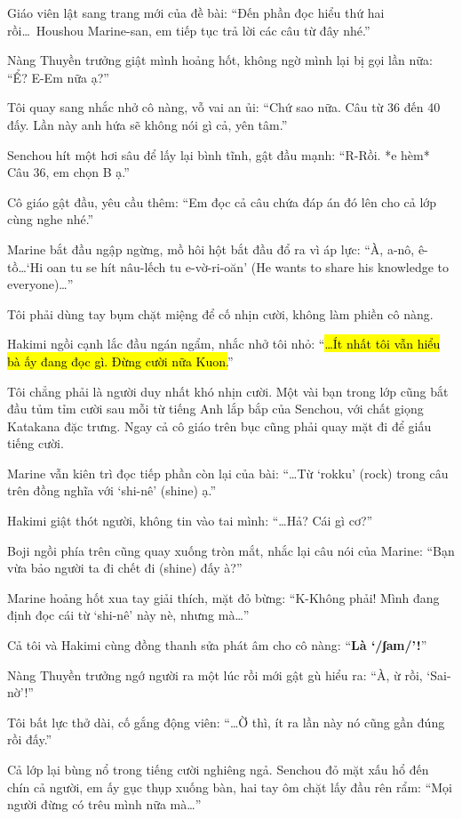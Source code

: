 \documentclass[../main.tex]{subfiles}
\begin{document}
Giáo viên lật sang trang mới của đề bài: ``Đến phần đọc hiểu thứ hai rồi\dots\ Houshou Marine-san, em tiếp tục trả lời các câu từ đây nhé.''

Nàng Thuyền trưởng giật mình hoảng hốt, không ngờ mình lại bị gọi lần nữa: ``Ể? E-Em nữa ạ?''

Tôi quay sang nhắc nhở cô nàng, vỗ vai an ủi: ``Chứ sao nữa. Câu từ 36 đến 40 đấy. Lần này anh hứa sẽ không nói gì cả, yên tâm.''

Senchou hít một hơi sâu để lấy lại bình tĩnh, gật đầu mạnh: ``R-Rồi. *e hèm* Câu 36, em chọn B ạ.''

Cô giáo gật đầu, yêu cầu thêm: ``Em đọc cả câu chứa đáp án đó lên cho cả lớp cùng nghe nhé.''

Marine bắt đầu ngập ngừng, mồ hôi hột bắt đầu đổ ra vì áp lực: ``À, a-nô, ê-tồ\dots `Hi oan tu se hít nâu-lếch tu e-vờ-ri-oăn' (He wants to share his knowledge to everyone)\dots''

Tôi phải dùng tay bụm chặt miệng để cố nhịn cười, không làm phiền cô nàng.

Hakimi ngồi cạnh lắc đầu ngán ngẩm, nhắc nhở tôi nhỏ: ``\hl{\dots Ít nhất tôi vẫn hiểu bà ấy đang đọc gì. Đừng cười nữa Kuon.}''

Tôi chẳng phải là người duy nhất khó nhịn cười. Một vài bạn trong lớp cũng bắt đầu tủm tỉm cười sau mỗi từ tiếng Anh lắp bắp của Senchou, với chất giọng Katakana đặc trưng. Ngay cả cô giáo trên bục cũng phải quay mặt đi để giấu tiếng cười.

Marine vẫn kiên trì đọc tiếp phần còn lại của bài: ``\dots Từ `rokku' (rock) trong câu trên đồng nghĩa với `shi-nê' (shine) ạ.''

Hakimi giật thót người, không tin vào tai mình: ``\dots Hả? Cái gì cơ?''

Boji ngồi phía trên cũng quay xuống tròn mắt, nhắc lại câu nói của Marine: ``Bạn vừa bảo người ta đi chết đi (shine) đấy à?''

Marine hoảng hốt xua tay giải thích, mặt đỏ bừng: ``K-Không phải! Mình đang định đọc cái từ `shi-nê' này nè, nhưng mà\dots''

Cả tôi và Hakimi cùng đồng thanh sửa phát âm cho cô nàng: ``\textbf{Là `/ʃaɪn/'!}''

Nàng Thuyền trưởng ngớ người ra một lúc rồi mới gật gù hiểu ra: ``À, ừ rồi, `Sai-nờ'!''

Tôi bất lực thở dài, cố gắng động viên: ``\dots Ờ thì, ít ra lần này nó cũng gần đúng rồi đấy.''

Cả lớp lại bùng nổ trong tiếng cười nghiêng ngả. Senchou đỏ mặt xấu hổ đến chín cả người, em ấy gục thụp xuống bàn, hai tay ôm chặt lấy đầu rên rẩm: ``Mọi người đừng có trêu mình nữa mà\dots''
\end{document}
